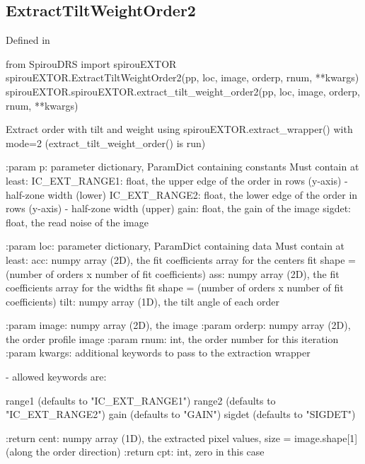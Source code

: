 
\noindent\begin{minipage}{\textwidth}
\subsection{ExtractTiltWeightOrder2}

Defined in \spirouEXTOR{}

\begin{pythonbox}
from SpirouDRS import spirouEXTOR
spirouEXTOR.ExtractTiltWeightOrder2(pp, loc, image, orderp, rnum, **kwargs)
spirouEXTOR.spirouEXTOR.extract_tilt_weight_order2(pp, loc, image, orderp, rnum, **kwargs)
\end{pythonbox}

\begin{pythondocstring}
Extract order with tilt and weight using
spirouEXTOR.extract_wrapper() with mode=2
(extract_tilt_weight_order() is run)

:param p: parameter dictionary, ParamDict containing constants
    Must contain at least:
            IC_EXT_RANGE1: float, the upper edge of the order in rows
                           (y-axis) - half-zone width (lower)
            IC_EXT_RANGE2: float, the lower edge of the order in rows
                           (y-axis) - half-zone width (upper)
            gain: float, the gain of the image
            sigdet: float, the read noise of the image

:param loc: parameter dictionary, ParamDict containing data
        Must contain at least:
            acc: numpy array (2D), the fit coefficients array for
                  the centers fit
                  shape = (number of orders x number of fit coefficients)
            ass: numpy array (2D), the fit coefficients array for
                  the widths fit
                  shape = (number of orders x number of fit coefficients)
            tilt: numpy array (1D), the tilt angle of each order

:param image: numpy array (2D), the image
:param orderp: numpy array (2D), the order profile image
:param rnum: int, the order number for this iteration
:param kwargs: additional keywords to pass to the extraction wrapper

        - allowed keywords are:

        range1  (defaults to "IC_EXT_RANGE1")
        range2  (defaults to "IC_EXT_RANGE2")
        gain    (defaults to "GAIN")
        sigdet  (defaults to "SIGDET")

:return cent: numpy array (1D), the extracted pixel values,
             size = image.shape[1] (along the order direction)
:return cpt: int, zero in this case
\end{pythondocstring}
\end{minipage}

